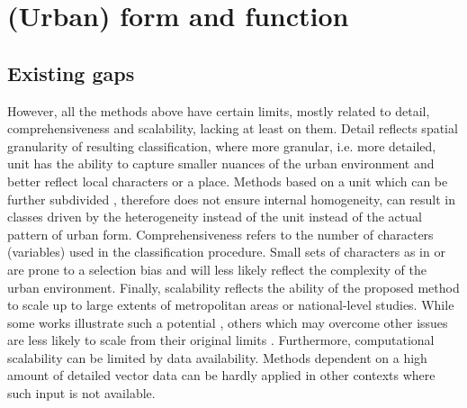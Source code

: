 \section{(Urban) form and function}
\label{sec:lit}






\subsection{Existing gaps}
\label{sec:lit_gaps}
However, all the methods above have certain limits, mostly related to detail, comprehensiveness and scalability, lacking at least on them. Detail reflects spatial granularity of resulting classification, where more granular, i.e. more detailed, unit has the ability to capture smaller nuances of the urban environment and better reflect local characters or a place. Methods based on a unit which can be further subdivided \citep{dibble2019origin,jochem2020,araldi2019,gil2012}, therefore does not ensure internal homogeneity, can result in classes driven by the heterogeneity instead of the unit instead of the actual pattern of urban form. Comprehensiveness refers to the number of characters (variables) used in the classification procedure. Small sets of characters as in \cite{bobkova2019} or \cite{serra2018a} are prone to a selection bias and will less likely reflect the complexity of the urban environment. Finally, scalability reflects the ability of the proposed method to scale up to large extents of metropolitan areas or national-level studies. While some works illustrate such a potential \citep{jochem2020, schirmer2015,bobkova2019,araldi2019}, others which may overcome other issues are less likely to scale from their original limits \citep{dibble2019origin}. Furthermore, computational scalability can be limited by data availability. Methods dependent on a high amount of detailed vector data \citep{bobkova2019} can be hardly applied in other contexts where such input is not available.

